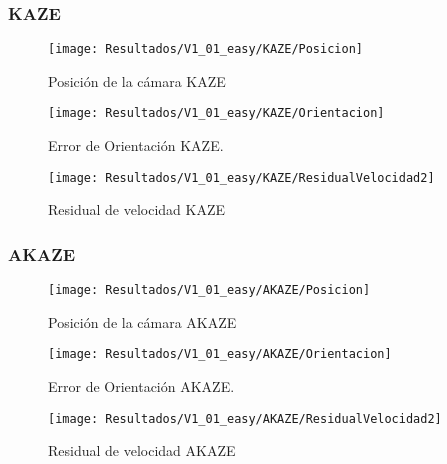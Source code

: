 \subsubsection{KAZE}


\begin{figure}[H]
	\centering
	\texttt{[image: Resultados/V1\_01\_easy/KAZE/Posicion]}
	\caption{Posición de la cámara KAZE}
	\label{imagen:Resultados/V1_01_easy/KAZE/Posicion}
\end{figure}


\begin{figure}[H]
	\centering
	\texttt{[image: Resultados/V1\_01\_easy/KAZE/Orientacion]}
	\caption[Error de Orientación KAZE]{Error de Orientación KAZE.}
	\label{imagen:Resultados/V1_01_easy/KAZE/Orientacion}
\end{figure}



\begin{figure}[H]
	\centering
	\texttt{[image: Resultados/V1\_01\_easy/KAZE/ResidualVelocidad2]}
	\caption{Residual de velocidad KAZE}
	\label{imagen:Resultados/V1_01_easy/KAZE/ResidualVelocidad}
\end{figure}



\subsubsection{AKAZE}


\begin{figure}[H]
	\centering
	\texttt{[image: Resultados/V1\_01\_easy/AKAZE/Posicion]}
	\caption{Posición de la cámara AKAZE}
	\label{imagen:Resultados/V1_01_easy/AKAZE/Posicion}
\end{figure}


\begin{figure}[H]
	\centering
	\texttt{[image: Resultados/V1\_01\_easy/AKAZE/Orientacion]}
	\caption[Error de Orientación AKAZE]{Error de Orientación AKAZE.}
	\label{imagen:Resultados/V1_01_easy/AKAZE/Orientacion}
\end{figure}



\begin{figure}[H]
	\centering
	\texttt{[image: Resultados/V1\_01\_easy/AKAZE/ResidualVelocidad2]}
	\caption{Residual de velocidad AKAZE}
	\label{imagen:Resultados/V1_01_easy/AKAZE/ResidualVelocidad}
\end{figure}


